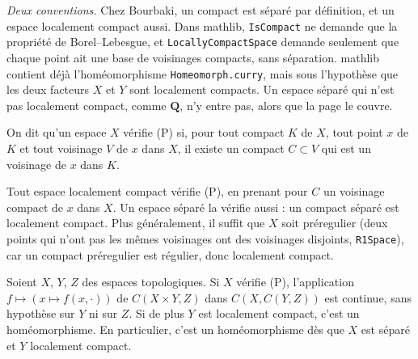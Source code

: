 \emph{Deux conventions.} Chez Bourbaki, un compact est séparé par définition, et un espace localement compact aussi. Dans mathlib, \texttt{IsCompact} ne demande que la propriété de Borel--Lebesgue, et \texttt{LocallyCompactSpace} demande seulement que chaque point ait une base de voisinages compacts, sans séparation. mathlib contient déjà l'homéomorphisme \texttt{Homeomorph.\allowbreak{}curry}, mais sous l'hypothèse que les deux facteurs $X$ et $Y$ sont localement compacts. Un espace séparé qui n'est pas localement compact, comme $\mathbf Q$, n'y entre pas, alors que la page le couvre.

\begin{definition}
On dit qu'un espace $X$ vérifie (P) si, pour tout compact $K$ de $X$, tout point $x$ de $K$ et tout voisinage $V$ de $x$ dans $X$, il existe un compact $C \subset V$ qui est un voisinage de $x$ dans $K$.
\end{definition}

Tout espace localement compact vérifie (P), en prenant pour $C$ un voisinage compact de $x$ dans $X$. Un espace séparé la vérifie aussi : un compact séparé est localement compact. Plus généralement, il suffit que $X$ soit préregulier (deux points qui n'ont pas les mêmes voisinages ont des voisinages disjoints, \texttt{R1Space}), car un compact préregulier est régulier, donc localement compact.

\begin{enonce}
Soient $X$, $Y$, $Z$ des espaces topologiques. Si $X$ vérifie (P), l'application $f \mapsto (x \mapsto f(x, \cdot))$ de $C(X \times Y, Z)$ dans $C(X, C(Y, Z))$ est continue, sans hypothèse sur $Y$ ni sur $Z$. Si de plus $Y$ est localement compact, c'est un homéomorphisme. En particulier, c'est un homéomorphisme dès que $X$ est séparé et $Y$ localement compact.
\end{enonce}

